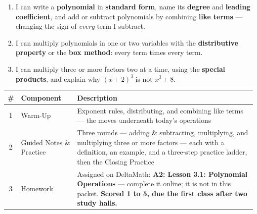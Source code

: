 \documentclass[12pt]{article}
\begin{document}

\namedateperiod
\vspace{0.18in}

\boxguard[14]
\begin{learningtargetbox}
\small
\begin{enumerate}[leftmargin=1.5em, itemsep=5pt]
  \item I can write a \textbf{polynomial} in \textbf{standard form}, name its \textbf{degree}
        and \textbf{leading coefficient}, and add or subtract polynomials by combining
        \textbf{like terms} --- changing the sign of \emph{every} term I subtract.
  \item I can multiply polynomials in one or two variables with the \textbf{distributive
        property} or the \textbf{box method}: every term times every term.
  \item I can multiply three or more factors two at a time, using the \textbf{special
        products}, and explain why $(x+2)^3$ is not $x^3+8$.
\end{enumerate}
\end{learningtargetbox}

\vspace{0.14in}

\boxguard[14]
\begin{tocbox}
\small
\renewcommand{\arraystretch}{1.5}
\begin{tabularx}{\linewidth}{@{} c l X @{}}
\rowcolor{forestbg}
\textbf{\#} & \textbf{Component} & \textbf{Description} \\
\midrule
1 & Warm-Up & Exponent rules, distributing, and combining like terms --- the moves underneath
              today's operations \\
2 & Guided Notes \& Practice & Three rounds --- adding \& subtracting, multiplying, and
              multiplying three or more factors --- each with a definition, an example, and a
              three-step practice ladder, then the Closing Practice \\
3 & Homework & Assigned on DeltaMath: \textbf{A2: Lesson 3.1: Polynomial Operations} --- complete it
              online; it is not in this packet. \textbf{Scored 1 to 5, due the first class after
              two study halls.} \\
\end{tabularx}
\end{tocbox}
\end{document}
